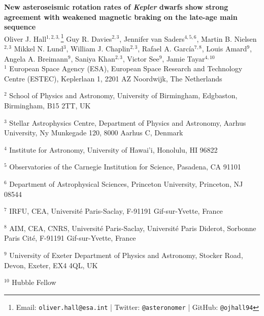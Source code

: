 \documentclass[12pt]{article}
\begin{document}
\noindent\textbf{\LARGE{New asteroseismic rotation rates of \emph{Kepler} dwarfs show strong agreement with weakened magnetic braking on the late-age main sequence}}\\

\noindent Oliver J. Hall$^{1,2,3,}$\footnote[1]{Email: \texttt{oliver.hall@esa.int} | Twitter: \texttt{@asteronomer} | GitHub: \texttt{@ojhall94}}
	Guy R. Davies$^{2,3}$, 
	Jennifer van Saders$^{4,5,6}$,
	Martin B. Nielsen$^{2,3}$
	Mikkel N. Lund$^{3}$, 
	William J. Chaplin$^{2,3}$, 
	Rafael A. Garc\'ia$^{7, 8}$, 
	Louis Amard$^{9}$,
	Angela A. Breimann$^{9}$, 
	Saniya Khan$^{2,3}$, 
	Victor See$^{9}$, 
	Jamie Tayar$^{4, 10}$
	\\
	
	\noindent $^{1}$ European Space Agency (ESA), European Space Research and Technology Centre (ESTEC), Keplerlaan 1, 2201 AZ Noordwijk, The Netherlands

	\noindent 	$^{2}$ School of Physics and Astronomy, University of Birmingham, Edgbaston, Birmingham, B15 2TT, UK

	\noindent 	$^{3}$ Stellar Astrophysics Centre, Department of Physics and Astronomy, Aarhus University, Ny Munkegade 120, 8000 Aarhus C, Denmark

	\noindent 	$^{4}$ Institute for Astronomy, University of Hawai'i, Honolulu, HI 96822

	\noindent 	$^{5}$ Observatories of the Carnegie Institution for Science, Pasadena, CA 91101

	\noindent 	$^{6}$ Department of Astrophysical Sciences, Princeton University, Princeton, NJ 08544

	\noindent 	$^{7}$ IRFU, CEA, Universit\'e Paris-Saclay, F-91191 Gif-sur-Yvette, France

	\noindent 	$^{8}$ AIM, CEA, CNRS, Universit\'e Paris-Saclay, Universit\'e Paris Diderot, Sorbonne Paris Cit\'e, F-91191 Gif-sur-Yvette, France

	\noindent 	$^{9}$ University of Exeter Department of Physics and Astronomy, Stocker Road, Devon, Exeter, EX4 4QL, UK
	
	\noindent $^{10}$ Hubble Fellow


\vspace{10mm}
\end{document}
